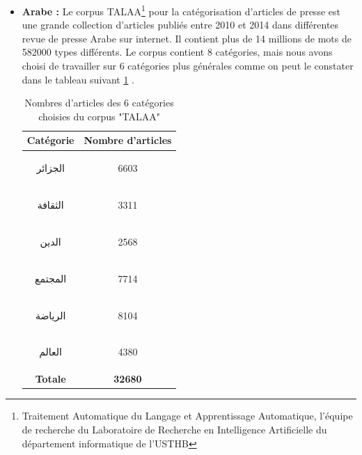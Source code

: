 \begin{itemize}
\begin{table}[H]
                    \label{news-categ}
                \end{table}
                \item{\textbf{Arabe : }}
                Le corpus TALAA\footnote{Traitement Automatique du Langage et Apprentissage Automatique, l'équipe de recherche du Laboratoire de Recherche en Intelligence Artificielle du département informatique de l'USTHB} pour la catégorisation d'articles de presse est une grande collection d'articles publiés entre 2010 et 2014 dans différentes revue de presse Arabe sur internet. Il contient plus de 14 millions de mots de 582000 types différents. Le corpus contient 8 catégories, mais nous avons choisi de travailler sur 6 catégories plus générales comme on peut le constater dans le tableau suivant \ref{talaa-categ} \cite{talaa}. 
                \begin{table}[H]
                    \begin{center}
                        \begin{tabular}{|c|c|}
                            \hline
                            \textbf{Catégorie} &  \textbf{Nombre d'articles} \\
                            \hline
                            \begin{arab}الجزائر\end{arab} & 6603 \\
                            \begin{arab}الثقافة\end{arab} & 3311 \\
                            \begin{arab}الدين\end{arab} & 2568 \\
                            \begin{arab}المجتمع\end{arab} & 7714 \\
                            \begin{arab}الرياضة\end{arab} & 8104 \\
                            \begin{arab}العالم\end{arab} & 4380 \\
                            \textbf{Totale} & \textbf{32680} \\
                            \hline
                        \end{tabular}
                    \end{center}
                    \caption{Nombres d'articles des 6 catégories choisies du corpus "TALAA"}
                    \label{talaa-categ}
                \end{table}
            \end{itemize}
